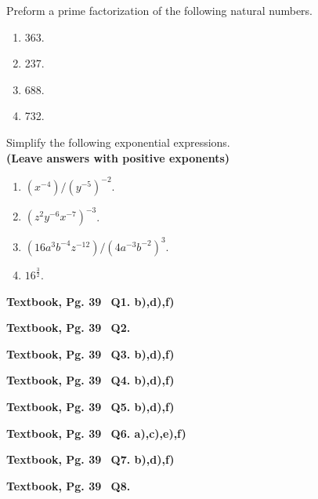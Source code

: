 \documentclass[12pt]{article} %
\begin{document}
\begin{qstn}
  Preform a prime factorization of the following natural numbers.
  \begin{enumerate}[label=(\alph*)]
    \item 363.
    \item 237.
    \item 688.
    \item 732.
  \end{enumerate}
\end{qstn}

\begin{qstn}
  Simplify the following exponential expressions.\\ \textbf{(Leave answers with positive exponents)}
  \begin{enumerate}[label=(\alph*)]
    \item $\left( x^{-4} \right) / \left( y^{-5} \right)^{-2}  $.
    \item $\left( z^2y^{-6}x^{-7} \right)^{-3}$.
    \item $\left( 16a^3b^{-4}z^{-12} \right)  / \left( 4a^{-3}b^{-2} \right)^{3}$.
    \item $16^{\frac{3}{2}}$.
  \end{enumerate}
\end{qstn}

\begin{qstn}
  \textbf{Textbook, Pg. 39\,\,\, Q1. b),d),f)}
\end{qstn}

\begin{qstn}
  \textbf{Textbook, Pg. 39\,\,\, Q2.}
\end{qstn}

\begin{qstn}
  \textbf{Textbook, Pg. 39\,\,\, Q3. b),d),f)}
\end{qstn}

\begin{qstn}
  \textbf{Textbook, Pg. 39\,\,\, Q4. b),d),f)}
\end{qstn}

\begin{qstn}
  \textbf{Textbook, Pg. 39\,\,\, Q5. b),d),f)}
\end{qstn}

\begin{qstn}
  \textbf{Textbook, Pg. 39\,\,\, Q6. a),c),e),f)}
\end{qstn}

\begin{qstn}
  \textbf{Textbook, Pg. 39\,\,\, Q7. b),d),f)}
\end{qstn}

\begin{qstn}
  \textbf{Textbook, Pg. 39\,\,\, Q8.}
\end{qstn}
\end{document}
